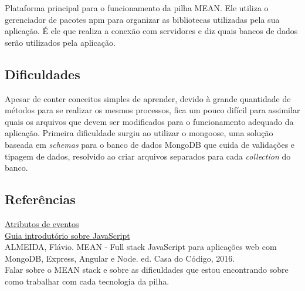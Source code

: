 \documentclass[a4paper, 12pt]{article}
\begin{document}
Plataforma principal para o funcionamento da pilha MEAN. Ele utiliza o gerenciador de pacotes npm para organizar as bibliotecas utilizadas pela sua aplicação. É ele que realiza a conexão com servidores e diz quais bancos de dados serão utilizados pela aplicação.


\subsection{Dificuldades}

Apesar de conter conceitos simples de aprender, devido à grande quantidade de métodos para se realizar os mesmos processos, fica um pouco difícil para assimilar quais os arquivos que devem ser modificados para o funcionamento adequado da aplicação.
Primeira dificuldade surgiu ao utilizar o mongoose, uma solução baseada em \textit{schemas} para o banco de dados MongoDB que cuida de validações e tipagem de dados, resolvido ao criar arquivos separados para cada \textit{collection} do banco.


\subsection{Referências}

\href{https://www.w3schools.com/tags/ref_eventattributes.asp}{Atributos de eventos}\\
\href{http://tableless.github.io/iniciantes/manual/js/}{Guia introdutório sobre JavaScript}\\

ALMEIDA, Flávio. MEAN - Full stack JavaScript para aplicações web com MongoDB, Express, Angular e Node. ed. Casa do Código, 2016.\\

Falar sobre o MEAN stack e sobre as dificuldades que estou encontrando sobre como trabalhar com cada tecnologia da pilha.
\end{document}

